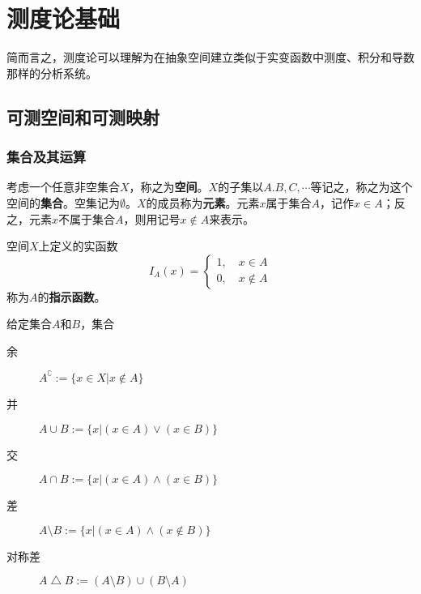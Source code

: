 \chapter{测度论基础}

简而言之，测度论可以理解为在抽象空间建立类似于实变函数中测度、积分和导数那样的分析系统。

\section{可测空间和可测映射}

\subsection{集合及其运算}

考虑一个任意非空集合$X$，称之为\textbf{空间}。$X$的子集以$A.B,C,\cdots $等记之，称之为这个空间的\textbf{集合}。空集记为$\emptyset$。$X$的成员称为\textbf{元素}。元素$x$属于集合$A$，记作$x \in A$；反之，元素$x$不属于集合$A$，则用记号$x \notin A$来表示。

\begin{definition}
    空间$X$上定义的实函数
    \[ I_{A}(x)=\begin{cases}
            1, \quad x \in A \\
            0, \quad x \notin A
        \end{cases} \]
    称为$A$的\textbf{指示函数}。
\end{definition}

\begin{definition}[集合的运算]
    给定集合$A$和$B$，集合
    \begin{description}
        \item[余] $A^{\complement} := \{ x \in X | x \notin A \}$
        \item[并] $A \cup B := \{ x | (x \in A)\vee(x \in B) \}$
        \item[交] $A \cap B := \{ x | (x \in A)\wedge(x \in B) \}$
        \item[差] $A \setminus B := \{ x | (x \in A)\wedge(x \notin B) \}$
        \item[对称差] $A \bigtriangleup B := (A \setminus B)\cup (B \setminus A)$
    \end{description}
\end{definition}

